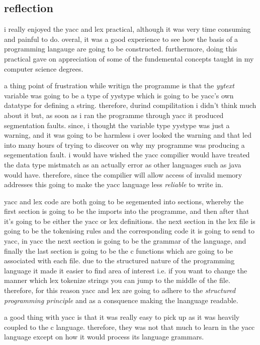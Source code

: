 \documentclass[
	12pt, %
]{fphw}
\begin{document}
\subsection{reflection}
i really enjoyed the yacc and lex practical, although it was very time consuming
and painful to do. overal, it was a good experience to see how the basis of
a programming langauge are going to be constructed. furthermore, doing this
practical gave on appreciation of some of the fundemental concepts taught in my
computer science degrees.\par

a thing point of frustration while writign the programme is that the \emph{yytext}
variable was going to be a type of yystype which is going to be yacc's own datatype
for defining a string. therefore, durind compilitation i didn't think much about
it but, as soon as i ran the programme through yacc it produced segmentation faults.
since, i thought the variable type yystype was just a warning, and it was
going to be harmless i over looked the warning and that led into many hours of
trying to discover on why my programme was producing a segementation fault. i
would have wished the yacc compilier would have treated the data type mistmatch
as an actually error as other languages such as java would have. therefore,
since the compilier will allow access of invalid memory addresses this going to
make the yacc language less \emph{reliable} to write in. \par

yacc and lex code are both going to be segemented into sections, whereby the
first section is going to be the imports into the programme, and then after that
it's going to be either the yacc or lex definitions. the next section in the lex
file is going to be the tokenising rules and the corresponding code it is going
to send to yacc, in yacc the next section is going to be the grammar of the
language, and finally the last section is going to be the c functions which are
going to be associated with each file. due to the structured nature of the
programming language it made it easier to find area of interest i.e. if you want
to change the manner which lex tokenize strings you can jump to the middle of the
file. therefore, for this reason yacc and lex are going to adhere to the
\emph{structured programming principle} and as a consquence making the lnanguage
readable.\par

a good thing with yacc is that it was really easy to pick up as it was heavily
coupled to the c language. therefore, they was not that much to learn in the
yacc language except on how it would process its language grammars. \par
\end{document}
